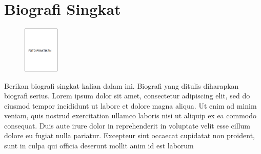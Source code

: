 \documentclass[conference]{IEEEtran}
\begin{document}

%
%


\section*{Biografi Singkat}

\begin{figure} %
    \centering
    \includegraphics[width=0.15\textwidth]{./Figures/pas-foto.png}
\end{figure}

\noindent Berikan biografi singkat kalian dalam ini. Biografi yang ditulis diharapkan biografi serius. Lorem ipsum dolor sit amet, consectetur adipiscing elit, sed do eiusmod tempor incididunt ut labore et dolore magna aliqua. Ut enim ad minim veniam, quis nostrud exercitation ullamco laboris nisi ut aliquip ex ea commodo consequat. Duis aute irure dolor in reprehenderit in voluptate velit esse cillum dolore eu fugiat nulla pariatur. Excepteur sint occaecat cupidatat non proident, sunt in culpa qui officia deserunt mollit anim id est laborum
\end{document}
